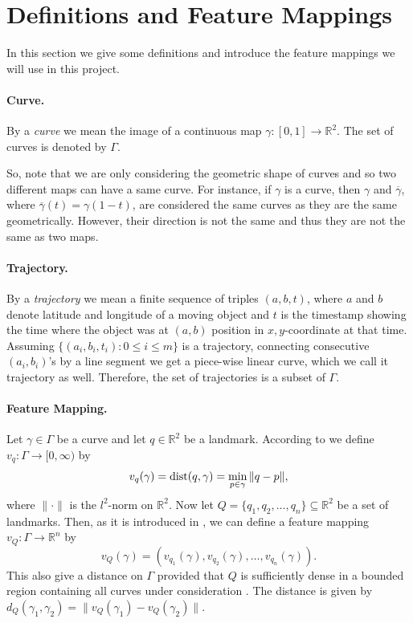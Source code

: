 \documentclass[11pt]{myclass}
\begin{document}
\section{Definitions and Feature Mappings}

In this section we give some definitions and introduce the feature mappings we will use in this project. 

\paragraph{Curve.}
By a {\it curve} we mean the image of a continuous map $\gamma: [0,1] \to \mathbb{R}^2$. The set of curves is denoted by $\Gamma$. 

So, note that we are only considering the geometric shape of curves and so two different maps can have a same curve. For instance, if $\gamma$ is a curve, then $\gamma$ and $\overline{\gamma}$, where $\overline{\gamma}(t) = \gamma(1-t)$, are considered the same curves as they are the same geometrically. However, their direction is not the same and thus they are not the same as two maps. 

\paragraph{Trajectory.}
By a {\it trajectory} we mean a finite sequence of triples $(a, b, t)$, where $a$ and $b$ denote latitude and longitude of a moving object and $t$ is the timestamp showing the time where the object was at $(a, b)$ position in $x, y$-coordinate at that time. Assuming $\{(a_i, b_i, t_i) : 0 \leq i \leq m\}$ is a trajectory, connecting consecutive $(a_i, b_i)$'s by a line segment we get a piece-wise linear curve, which we call it trajectory as well. Therefore, the set of trajectories is a subset of $\Gamma$. 

\paragraph{Feature Mapping.} \label{features}
Let $\gamma \in \Gamma$ be a curve and let $q \in \mathbb{R}^2$ be a landmark. According to \cite{PT19a} we define $v_q: \Gamma \to [0, \infty)$ by 
\[
v_q(\gamma) = {\rm dist}(q, \gamma) = \min_{p \in \gamma} \|q-p\|,
\]
where $\|\cdot\|$ is the $l^2$-norm on $\mathbb{R}^2$. Now let $Q = \{q_1, q_2, \ldots, q_n\} \subseteq \mathbb{R}^2$ be a set of landmarks. Then, as it is introduced in \cite{PT19a}, we can define a feature mapping $v_Q: \Gamma \to \mathbb{R}^n$ by 
\[
v_Q(\gamma) = (v_{q_1}(\gamma), v_{q_2}(\gamma), \ldots, v_{q_n}(\gamma)).
\]
This also give a distance on $\Gamma$ provided that $Q$ is sufficiently dense in a bounded region containing all curves under consideration \cite{PT19a}. The distance is given by $d_Q(\gamma_1, \gamma_2) = \|v_Q(\gamma_1) - v_Q(\gamma_2)\|$.
\end{document}
